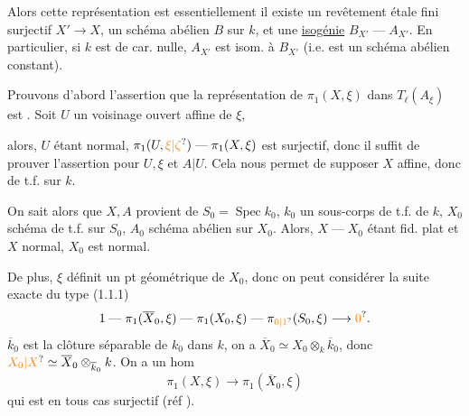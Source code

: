 Alors cette représentation est essentiellement   il existe un revêtement étale fini surjectif $X'\longrightarrow X$,  un schéma abélien $B$ sur $k$,  et une \uline{isogénie}  $B_{X'}\mathrel{\text{---}}A_{X'}$.  En particulier, si $k$ est de car. nulle,  $A_{X'}$ est isom. à $B_{X'}$ (i.e. est un schéma abélien constant).

Prouvons d'abord l'assertion que la représentation de $\pi_1(X,\xi)$ dans $T_\ell(A_\xi)$ est  .   Soit $U$ un voisinage ouvert affine de $\xi$,

alors,  $U$ étant normal, $\pi_1(U,\unsure{\xi|\zeta})\mathrel{\text{---}}\pi_1(X,\xi)$ est surjectif, donc il  suffit de prouver l'assertion pour $U,\xi$ et $A|U$. Cela nous permet de supposer $X$ affine, donc de t.f. sur $k$.

On sait alors que $X,A$ provient de $S_0=\operatorname{Spec}k_0$, $k_0$ un sous-corps de t.f. de $k$, $X_0$ schéma de t.f. sur $S_0$, $A_0$ schéma abélien sur $X_0$. Alors,  $X\mathrel{\text{---}}X_0$ étant fid. plat et $X$ normal, $X_0$ est normal.


De plus, $\xi$ définit un pt géométrique de $X_0$, donc on peut considérer  la suite exacte du type (1.1.1)
\[
1\mathrel{\text{---}}\pi_1(\overline X_0,\xi)\mathrel{\text{---}}\pi_1(X_0,\xi)\mathrel{\text{---}}\pi_{\unsure{0|1}}(S_0,\xi)\longrightarrow\unsure{0}.
\]
 $\overline k_0$ est la clôture séparable de $k_0$ dans $k$, on a $\overline X_0\simeq X_0\otimes_{k}\overline k_0$, donc $\unsure{X_0|X}\simeq\overline X_0\otimes_{\overline k_0}k$. On a un hom 
\[
\pi_1(X,\xi)\longrightarrow\pi_1(\overline X_0,\xi)
\tag*{(1.5.1)}
\]
qui est en tous cas surjectif  (réf \quad).

